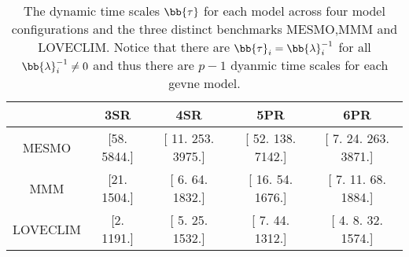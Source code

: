 \begin{table}[]
\begin{tabular}{ccccc}
         & \textbf{3SR} & \textbf{4SR} & \textbf{5PR} & \textbf{6PR} \\
         \toprule
MESMO    & [58.  5844.] & [  11.  253. 3975.] & [  52.  138. 7142.] & [   7.   24.  263. 3871.] \\
MMM      & [21.  1504.] & [   6.   64. 1832.] & [  16.   54. 1676.] & [   7.   11.   68. 1884.] \\
LOVECLIM & [2.   1191.] & [   5.   25. 1532.] & [   7.   44. 1312.] & [   4.    8.   32. 1574.]  \\
\end{tabular}
    \caption{The dynamic time scales $\bb{\tau}$ for each model across four model configurations and the three distinct benchmarks MESMO,MMM and LOVECLIM. Notice that there are $\bb{\tau}_i=\bb{\lambda}^{-1}_i$ for all $\bb{\lambda}^{-1}_i \neq 0$ and thus there are $p-1$ dyanmic time scales for each gevne model. }
\end{table}



